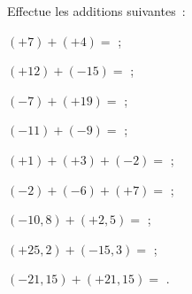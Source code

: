 \begin{methode*1}
 \exercice  
Effectue les additions suivantes : \\[.1em]
\begin{colenumerate}{1}
 \item $(+7) + (+4 )=$ \dotfill; \\[.1em]
 \item $(+12) + (-15)=$ \dotfill; \\[.1em]
 \item $(-7) + (+19)=$ \dotfill; \\[.1em]
 \item $(-11) + (-9)=$ \dotfill; \\[.1em]
 \item $(+1) + (+3) + (-2)=$ \dotfill; \\[.1em]
 \item $(-2) + (-6) + (+7)=$ \dotfill; \\[.1em]
 \item $(-10,8) + (+2,5)=$ \dotfill; \\[.1em]
 \item $(+25,2) + (-15,3)=$ \dotfill; \\[.1em]
 \item $(-21,15) + (+21,15)=$ \dotfill.
 \end{colenumerate}

 \end{methode*1}


